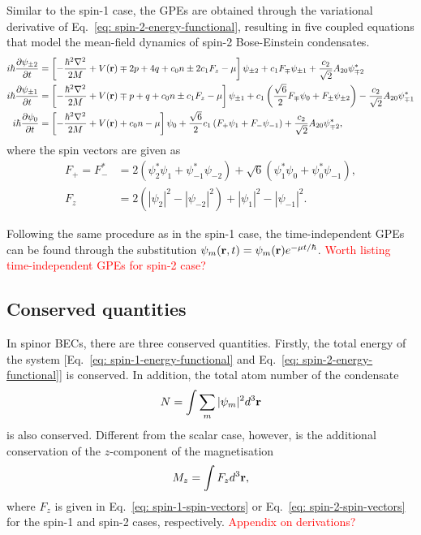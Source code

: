 Similar to the spin-1 case, the GPEs are obtained through the variational
derivative of Eq.~\eqref{eq: spin-2-energy-functional}, resulting in
five coupled equations that model the mean-field dynamics of spin-2
Bose-Einstein condensates.
\begin{align}
    i\hbar\pdv{\psi_{\pm 2}}{t} &= \left[-\frac{\hbar^2\nabla^2}{2M}
    + V(\vb{r}) \mp 2p + 4q + c_0n \pm 2c_1F_z - \mu\right]\psi_{\pm 2}
    + c_1F_{\mp}\psi_{\pm 1} + \frac{c_2}{\sqrt{2}}A_{20}\psi_{\mp 2}^* \\
    i\hbar\pdv{\psi_{\pm 1}}{t} &= \left[-\frac{\hbar^2\nabla^2}{2M}
    + V(\vb{r}) \mp p + q + c_0n \pm c_1F_z - \mu\right]\psi_{\pm 1}
    + c_1\left(\frac{\sqrt{6}}{2}F_{\mp}\psi_0 + F_{\pm}\psi_{\pm 2}\right)
    - \frac{c_2}{\sqrt{2}}A_{20}\psi_{\mp 1}^* \\
    i\hbar\pdv{\psi_0}{t} &= \left[-\frac{\hbar^2\nabla^2}{2M}
    + V(\vb{r}) + c_0n - \mu\right]\psi_0
    + \frac{\sqrt{6}}{2}c_1\left(F_+\psi_1 + F_-\psi_{-1}\right) 
    + \frac{c_2}{\sqrt{2}}A_{20}\psi_{\mp 2}^*,
\end{align}
where the spin vectors are given as
\begin{align}\label{eq: spin-2-spin-vectors}
    F_+ = F_-^* &= 2(\psi_2^*\psi_1 + \psi_{-1}^*\psi_{-2}) 
    + \sqrt{6}(\psi_1^*\psi_0 + \psi_0^*\psi_{-1}), \\
    F_z &= 2(|\psi_2|^2 - |\psi_{-2}|^2) + |\psi_1|^2 - |\psi_{-1}|^2.
\end{align}

Following the same procedure as in the spin-1 case, the time-independent GPEs
can be found through the substitution
\(\psi_m(\vb{r}, t) = \psi_m(\vb{r})e^{-\mu t/\hbar}\).
\textcolor{red}{Worth listing time-independent GPEs for spin-2 case?}

\subsection{Conserved quantities}
In spinor BECs, there are three conserved quantities.
Firstly, the total energy of the system
[Eq.~\eqref{eq: spin-1-energy-functional} and
Eq.~\eqref{eq: spin-2-energy-functional}] is conserved.
In addition, the total atom number of the condensate
\begin{equation}
    N = \int \sum_m |\psi_m|^2 d^3\vb{r}
\end{equation}
is also conserved.
Different from the scalar case, however, is the additional conservation of the
\(z\)-component of the magnetisation
\begin{equation}
    M_z = \int F_z d^3\vb{r},
\end{equation}
where \(F_z\) is given in Eq.~\eqref{eq: spin-1-spin-vectors} or
Eq.~\eqref{eq: spin-2-spin-vectors} for the spin-1 and spin-2 cases,
respectively.
\textcolor{red}{Appendix on derivations?}
